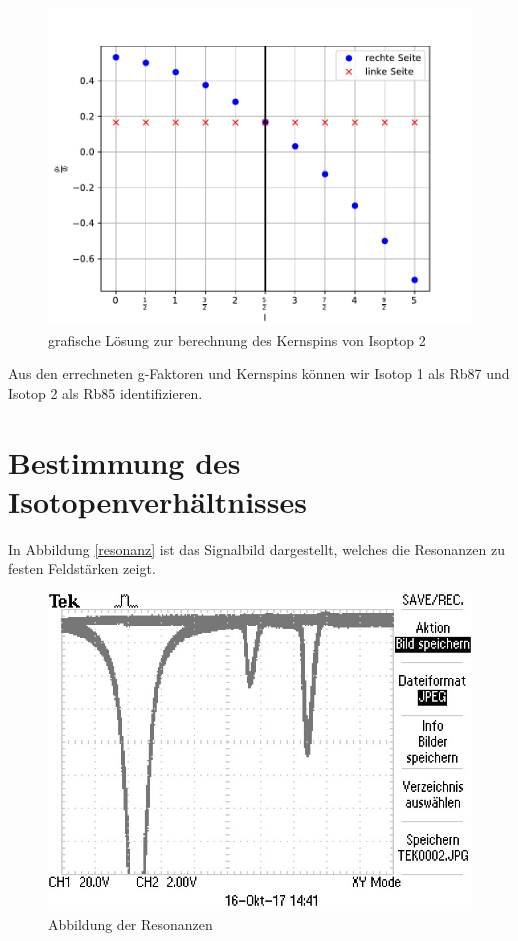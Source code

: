 \begin{figure}[H]
\centering
\includegraphics[scale=0.8]{./optischesPumpen/img/coreSpin2.pdf}
\caption{grafische Lösung zur berechnung des Kernspins von Isoptop 2}
\label{LandeIso2}
\end{figure}

Aus den errechneten g-Faktoren und Kernspins können wir Isotop 1 als Rb87 und Isotop 2 als Rb85 identifizieren.


\section{Bestimmung des Isotopenverhältnisses}
In Abbildung \autoref{resonanz} ist das Signalbild dargestellt, welches die Resonanzen zu festen
Feldstärken zeigt.

\begin{figure}[H]
\centering
\includegraphics[scale=0.8]{./optischesPumpen/img/TEK0002.JPG}
\caption{Abbildung der Resonanzen}
\label{resonanz}
\end{figure}



